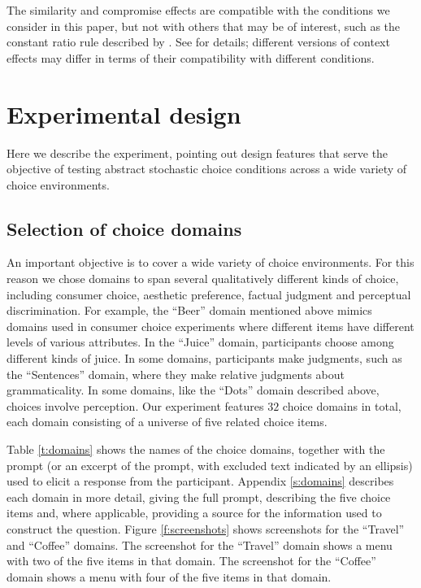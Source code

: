 \documentclass[11pt,letter]{article}
\begin{document}
The similarity and compromise effects are compatible with the conditions we consider in this paper, but not with others that may be of interest, such as the constant ratio rule described by \citet{Tver72b}.
See \citet{StobMarlMcCaTurn23} for details; different versions of context effects may differ in terms of their compatibility with different conditions.

\section{Experimental design}\label{s:design}

Here we describe the experiment, pointing out design features that serve the objective of testing abstract stochastic choice conditions across a wide variety of choice environments.

\subsection{Selection of choice domains}

An important objective is to cover a wide variety of choice environments.
For this reason we chose domains to span several qualitatively different kinds of choice, including consumer choice, aesthetic preference, factual judgment and perceptual discrimination.
For example, the ``Beer'' domain mentioned above mimics domains used in consumer choice experiments where different items have different levels of various attributes.
In the ``Juice'' domain, participants choose among different kinds of juice.
In some domains, participants make judgments, such as the ``Sentences'' domain, where they make relative judgments about grammaticality.
In some domains, like the ``Dots'' domain described above, choices involve perception.
Our experiment features $32$ choice domains in total, each domain consisting of a universe of five related choice items.

Table \ref{t:domains} shows the names of the choice domains, together with the prompt (or an excerpt of the prompt, with excluded text indicated by an ellipsis) used to elicit a response from the participant.
Appendix \ref{s:domains} describes each domain in more detail, giving the full prompt, describing the five choice items and, where applicable, providing a source for the information used to construct the question.
Figure \ref{f:screenshots} shows screenshots for the ``Travel'' and ``Coffee'' domains.
The screenshot for the ``Travel'' domain shows a menu with two of the five items in that domain.
The screenshot for the ``Coffee'' domain shows a menu with four of the five items in that domain.
\end{document}
